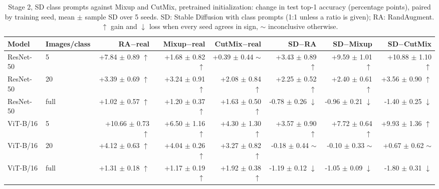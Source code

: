 \begin{table}[H]
\centering
\small
\setlength{\tabcolsep}{4pt}
\caption{Stage 2, SD class prompts against Mixup and CutMix, pretrained initialization: change in test top-1 accuracy (percentage points), paired by training seed, mean $\pm$ sample SD over 5 seeds. SD: Stable Diffusion with class prompts (1:1 unless a ratio is given); RA: RandAugment. $\uparrow$ gain and $\downarrow$ loss when every seed agrees in sign, $\sim$ inconclusive otherwise.}
\label{tab:stage2-mixing-pretrained-test}
\begin{tabular}{llrrrrrr}
\toprule
Model & Images/class & RA$-$real & Mixup$-$real & CutMix$-$real & SD$-$RA & SD$-$Mixup & SD$-$CutMix \\
\midrule
ResNet-50 & 5 & +7.84 $\pm$ 0.89 $\uparrow$ & +1.68 $\pm$ 0.82 $\uparrow$ & +0.39 $\pm$ 0.44 $\sim$ & +3.43 $\pm$ 0.89 $\uparrow$ & +9.59 $\pm$ 1.01 $\uparrow$ & +10.88 $\pm$ 1.10 $\uparrow$ \\
ResNet-50 & 20 & +3.39 $\pm$ 0.69 $\uparrow$ & +3.24 $\pm$ 0.91 $\uparrow$ & +2.08 $\pm$ 0.84 $\uparrow$ & +2.25 $\pm$ 0.52 $\uparrow$ & +2.40 $\pm$ 0.61 $\uparrow$ & +3.56 $\pm$ 0.90 $\uparrow$ \\
ResNet-50 & full & +1.02 $\pm$ 0.57 $\uparrow$ & +1.20 $\pm$ 0.37 $\uparrow$ & +1.63 $\pm$ 0.50 $\uparrow$ & -0.78 $\pm$ 0.26 $\downarrow$ & -0.96 $\pm$ 0.21 $\downarrow$ & -1.40 $\pm$ 0.25 $\downarrow$ \\
\midrule
ViT-B/16 & 5 & +10.66 $\pm$ 0.73 $\uparrow$ & +6.50 $\pm$ 1.16 $\uparrow$ & +4.30 $\pm$ 1.30 $\uparrow$ & +3.57 $\pm$ 0.90 $\uparrow$ & +7.72 $\pm$ 0.64 $\uparrow$ & +9.93 $\pm$ 1.36 $\uparrow$ \\
ViT-B/16 & 20 & +4.12 $\pm$ 0.63 $\uparrow$ & +4.04 $\pm$ 0.26 $\uparrow$ & +3.27 $\pm$ 0.82 $\uparrow$ & -0.18 $\pm$ 0.44 $\sim$ & -0.10 $\pm$ 0.33 $\sim$ & +0.67 $\pm$ 0.62 $\sim$ \\
ViT-B/16 & full & +1.31 $\pm$ 0.18 $\uparrow$ & +1.17 $\pm$ 0.19 $\uparrow$ & +1.92 $\pm$ 0.38 $\uparrow$ & -1.19 $\pm$ 0.12 $\downarrow$ & -1.05 $\pm$ 0.09 $\downarrow$ & -1.80 $\pm$ 0.31 $\downarrow$ \\
\bottomrule
\end{tabular}
\end{table}
